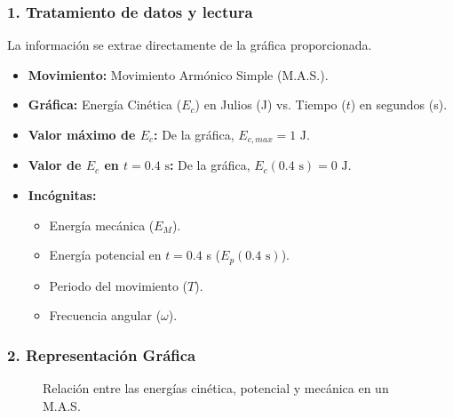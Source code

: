 \subsubsection*{1. Tratamiento de datos y lectura}
La información se extrae directamente de la gráfica proporcionada.
\begin{itemize}
    \item \textbf{Movimiento:} Movimiento Armónico Simple (M.A.S.).
    \item \textbf{Gráfica:} Energía Cinética ($E_c$) en Julios (J) vs. Tiempo ($t$) en segundos (s).
    \item \textbf{Valor máximo de $E_c$:} De la gráfica, $E_{c,max} = 1 \text{ J}$.
    \item \textbf{Valor de $E_c$ en $t=0.4\text{ s}$:} De la gráfica, $E_c(0.4\text{ s}) = 0 \text{ J}$.
    \item \textbf{Incógnitas:}
    \begin{itemize}
        \item Energía mecánica ($E_M$).
        \item Energía potencial en $t=0.4$ s ($E_p(0.4\text{ s})$).
        \item Periodo del movimiento ($T$).
        \item Frecuencia angular ($\omega$).
    \end{itemize}
\end{itemize}

\subsubsection*{2. Representación Gráfica}
\begin{figure}[H]
    \centering
    \caption{Relación entre las energías cinética, potencial y mecánica en un M.A.S.}
\end{figure}

